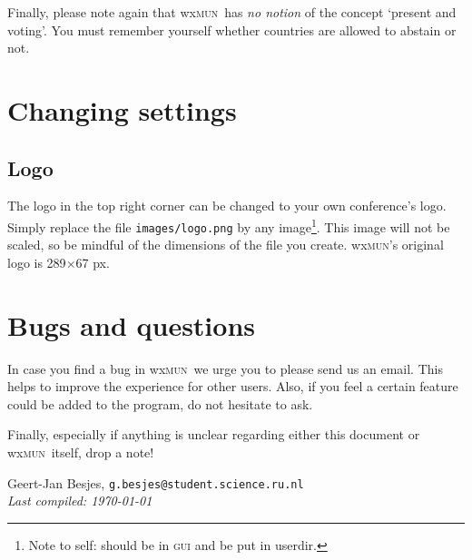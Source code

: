\documentclass[11pt, a4paper]{article}
\newcommand\wxMUN{wx\textsc{mun}}
\begin{document}
Finally, please note again that \wxMUN\ has \emph{no notion} of the concept `present and voting'. You must remember yourself whether countries are allowed to abstain or not.

\section{Changing settings}
\subsection{Logo}
The logo in the top right corner can be changed to your own conference's logo. Simply replace the file \texttt{images/logo.png} by any image\footnote{Note to self: should be in \textsc{gui} and be put in userdir.}. This image will not be scaled, so be mindful of the dimensions of the file you create. \wxMUN 's original logo is 289$\times$67 px.

\section{Bugs and questions}
In case you find a bug in \wxMUN\, we urge you to please send us an email. This helps to improve the experience for other users. Also, if you feel a certain feature could be added to the program, do not hesitate to ask. 

Finally, especially if anything is unclear regarding either this document or \wxMUN\ itself, drop a note!

\vfill
\noindent 
Geert-Jan Besjes, \texttt{g.besjes@student.science.ru.nl} \label{email} \\
\emph{Last compiled: \today}
\end{document}
